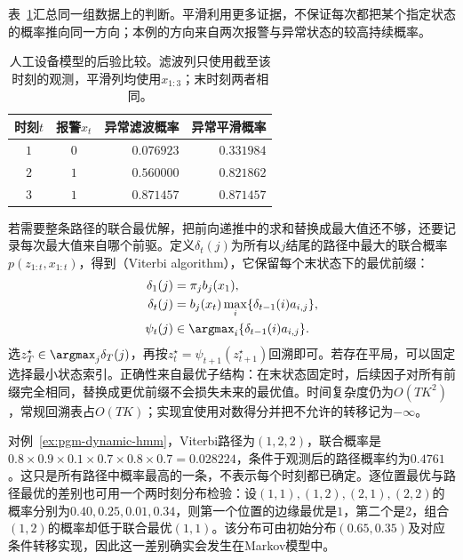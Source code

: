表~\ref{tab:pgm-dynamic-hmm-example}汇总同一组数据上的判断。平滑利用更多证据，不保证每次都把某个指定状态的概率推向同一方向；本例的方向来自两次报警与异常状态的较高持续概率。

\begin{table}[htbp]
  \centering
  \begin{tabular}{ccrr}
    \toprule
    时刻$t$ & 报警$x_t$ & 异常滤波概率 & 异常平滑概率 \\
    \midrule
    $1$ & $0$ & $0.076923$ & $0.331984$ \\
    $2$ & $1$ & $0.560000$ & $0.821862$ \\
    $3$ & $1$ & $0.871457$ & $0.871457$ \\
    \bottomrule
  \end{tabular}
  \caption{人工设备模型的后验比较。滤波列只使用截至该时刻的观测，平滑列均使用$x_{1:3}$；末时刻两者相同。}
  \label{tab:pgm-dynamic-hmm-example}
\end{table}

若需要整条路径的联合最优解，把前向递推中的求和替换成最大值还不够，还要记录每次最大值来自哪个前驱。定义$\delta_t(j)$为所有以$j$结尾的路径中最大的联合概率$p(z_{1:t},x_{1:t})$，得到（Viterbi algorithm），它保留每个末状态下的最优前缀：
\begin{equation}
  \begin{aligned}
    \delta_1(j)&=\pi_jb_j(x_1),\\
    \delta_t(j)&=b_j(x_t)\max_i
      \{\delta_{t-1}(i)a_{i,j}\},\\
    \psi_t(j)&\in\argmax_i
      \{\delta_{t-1}(i)a_{i,j}\}.
  \end{aligned}
  \label{eq:pgm-dynamic-viterbi}
\end{equation}
选$z_T^\star\in\argmax_j\delta_T(j)$，再按$z_t^\star=\psi_{t+1}(z_{t+1}^\star)$回溯即可。若存在平局，可以固定选择最小状态索引。正确性来自最优子结构：在末状态固定时，后续因子对所有前缀完全相同，替换成更优前缀不会损失未来的最优值。时间复杂度仍为$O(TK^2)$，常规回溯表占$O(TK)$；实现宜使用对数得分并把不允许的转移记为$-\infty$。

对例~\ref{ex:pgm-dynamic-hmm}，Viterbi路径为$(1,2,2)$，联合概率是$0.8\times0.9\times0.1\times0.7\times0.8\times0.7=0.028224$，条件于观测后的路径概率约为$0.4761$。这只是所有路径中概率最高的一条，不表示每个时刻都已确定。逐位置最优与路径最优的差别也可用一个两时刻分布检验：设$(1,1),(1,2),(2,1),(2,2)$的概率分别为$0.40,0.25,0.01,0.34$，则第一个位置的边缘最优是$1$，第二个是$2$，组合$(1,2)$的概率却低于联合最优$(1,1)$。该分布可由初始分布$(0.65,0.35)$及对应条件转移实现，因此这一差别确实会发生在Markov模型中。

